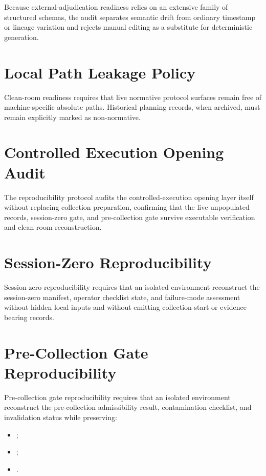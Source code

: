 \documentclass[11pt,a4paper]{article}
\begin{document}
Because external-adjudication readiness relies on an extensive family of
structured schemas, the audit separates semantic drift from ordinary timestamp
or lineage variation and rejects manual editing as a substitute for deterministic
generation.

\section{Local Path Leakage Policy}

Clean-room readiness requires that live normative protocol surfaces remain free
of machine-specific absolute paths. Historical planning records, when archived,
must remain explicitly marked as non-normative.

\section{Controlled Execution Opening Audit}

The reproducibility protocol audits the controlled-execution opening layer itself without replacing
collection preparation, confirming that the live unpopulated records, session-zero gate, and
pre-collection gate survive executable verification and clean-room
reconstruction.

\section{Session-Zero Reproducibility}

Session-zero reproducibility requires that an isolated environment reconstruct the
session-zero manifest, operator checklist state, and failure-mode assessment
without hidden local inputs and without emitting collection-start or
evidence-bearing records.

\section{Pre-Collection Gate Reproducibility}

Pre-collection gate reproducibility requires that an isolated environment reconstruct the
pre-collection admissibility result, contamination checklist, and
invalidation status while preserving:

\begin{itemize}
\item \texttt{\allowbreak{}\allowbreak{}\allowbreak{}};
\item \texttt{\allowbreak{}\allowbreak{}\allowbreak{}};
\item \texttt{\allowbreak{}\allowbreak{}\allowbreak{}}.
\end{itemize}
\end{document}
